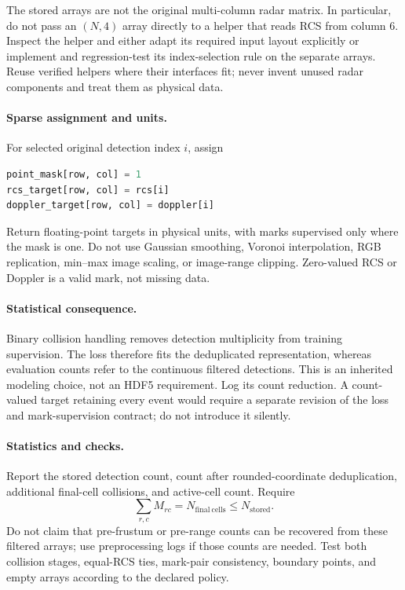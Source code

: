\documentclass[11pt,a4paper]{article}
\begin{document}
The stored arrays are not the original multi-column radar matrix. In particular, do not pass an \((N,4)\) array directly to a helper that reads RCS from column 6. Inspect the helper and either adapt its required input layout explicitly or implement and regression-test its index-selection rule on the separate arrays. Reuse verified helpers where their interfaces fit; never invent unused radar components and treat them as physical data.

\paragraph{Sparse assignment and units.}
For selected original detection index \(i\), assign
\begin{lstlisting}[language=Python]
point_mask[row, col] = 1
rcs_target[row, col] = rcs[i]
doppler_target[row, col] = doppler[i]
\end{lstlisting}
Return floating-point targets in physical units, with marks supervised only where the mask is one. Do not use Gaussian smoothing, Voronoi interpolation, RGB replication, min--max image scaling, or image-range clipping. Zero-valued RCS or Doppler is a valid mark, not missing data.

\paragraph{Statistical consequence.}
Binary collision handling removes detection multiplicity from training supervision. The loss therefore fits the deduplicated representation, whereas evaluation counts refer to the continuous filtered detections. This is an inherited modeling choice, not an HDF5 requirement. Log its count reduction. A count-valued target retaining every event would require a separate revision of the loss and mark-supervision contract; do not introduce it silently.

\paragraph{Statistics and checks.}
Report the stored detection count, count after rounded-coordinate deduplication, additional final-cell collisions, and active-cell count. Require
\[
 \sum_{r,c}M_{rc}=N_{\mathrm{final\ cells}}\le N_{\mathrm{stored}}.
\]
Do not claim that pre-frustum or pre-range counts can be recovered from these filtered arrays; use preprocessing logs if those counts are needed. Test both collision stages, equal-RCS ties, mark-pair consistency, boundary points, and empty arrays according to the declared policy.
\end{document}
